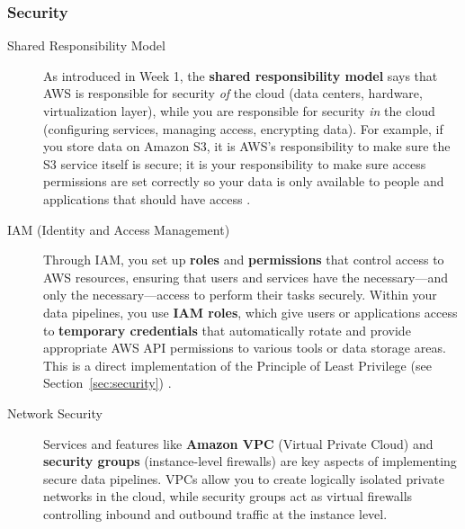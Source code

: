 \documentclass{article}
\begin{document}
\subsubsection{Security}
\label{sec:aws-security}
\begin{description}
    \item[Shared Responsibility Model] As introduced in Week 1, the \textbf{shared responsibility model} says that AWS is responsible for security \textit{of} the cloud (data centers, hardware, virtualization layer), while you are responsible for security \textit{in} the cloud (configuring services, managing access, encrypting data). For example, if you store data on Amazon S3, it is AWS's responsibility to make sure the S3 service itself is secure; it is your responsibility to make sure access permissions are set correctly so your data is only available to people and applications that should have access \cite{aws2023shared}.

    \item[IAM (Identity and Access Management)] Through IAM, you set up \textbf{roles} and \textbf{permissions} that control access to AWS resources, ensuring that users and services have the necessary---and only the necessary---access to perform their tasks securely. Within your data pipelines, you use \textbf{IAM roles}, which give users or applications access to \textbf{temporary credentials} that automatically rotate and provide appropriate AWS API permissions to various tools or data storage areas. This is a direct implementation of the Principle of Least Privilege (see Section~\ref{sec:security}) \cite{aws2023iam}.

    \item[Network Security] Services and features like \textbf{Amazon VPC} (Virtual Private Cloud) and \textbf{security groups} (instance-level firewalls) are key aspects of implementing secure data pipelines. VPCs allow you to create logically isolated private networks in the cloud, while security groups act as virtual firewalls controlling inbound and outbound traffic at the instance level.
\end{description}
\end{document}
